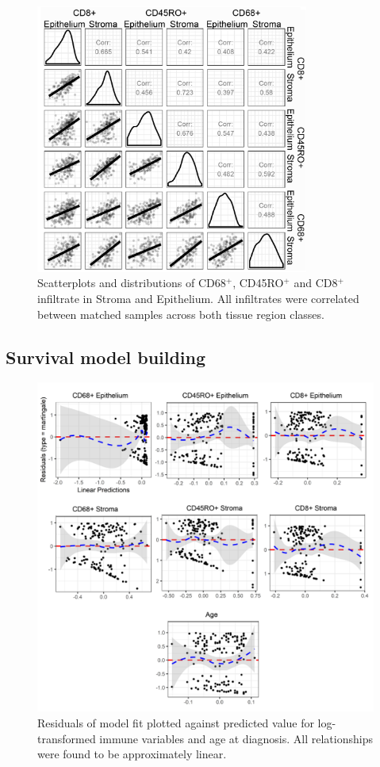 \begin{figure}
    \centering
    \includegraphics[width=0.8\textwidth]{Chapter2/Figs/Raster/correlation_inf.png}
    \caption[Correlation between infiltrates]{Scatterplots and distributions of CD68$^+$, CD45RO$^+$ and CD8$^+$ infiltrate in Stroma and Epithelium. All infiltrates were correlated between matched samples across both tissue region classes.}
    \label{fig:ch2_correlation}
\end{figure}

\subsection{Survival model building}
\begin{figure}
    \centering
    \includegraphics[width=\textwidth]{Chapter2/Figs/Raster/modelfit_2-08.png}
    \caption[Residuals of model fit]{Residuals of model fit plotted against predicted value for log-transformed immune variables and age at diagnosis. All relationships were found to be approximately linear.}
    \label{fig:modelfit}
\end{figure}

